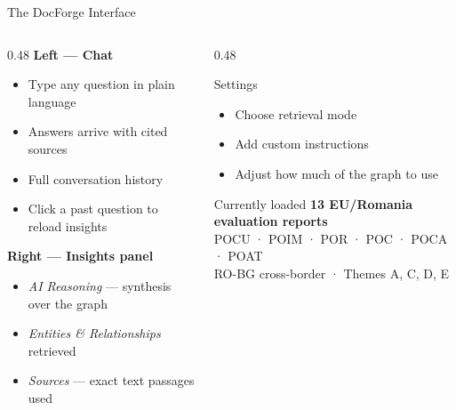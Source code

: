 \documentclass[aspectratio=169,11pt]{beamer}
\begin{document}
\begin{frame}{The DocForge Interface}
  \vspace{0.1cm}
  \begin{columns}[t]
    \begin{column}{0.48\textwidth}
      \textbf{Left — Chat}
      \begin{itemize}\setlength\itemsep{7pt}
        \item Type any question in plain language
        \item Answers arrive with cited sources
        \item Full conversation history
        \item Click a past question to reload insights
      \end{itemize}
      \vspace{0.5em}
      \textbf{Right — Insights panel}
      \begin{itemize}\setlength\itemsep{7pt}
        \item \textit{AI Reasoning} — synthesis over the graph
        \item \textit{Entities \& Relationships} retrieved
        \item \textit{Sources} — exact text passages used
      \end{itemize}
    \end{column}
    \begin{column}{0.48\textwidth}
      \begin{block}{Settings}
        \begin{itemize}\setlength\itemsep{6pt}
          \item Choose retrieval mode
          \item Add custom instructions
          \item Adjust how much of the graph to use
        \end{itemize}
      \end{block}
      \vspace{0.5em}
      \begin{alertblock}{Currently loaded}
        \textbf{13 EU/Romania evaluation reports}\\[4pt]
        POCU · POIM · POR · POC · POCA · POAT\\
        RO-BG cross-border · Themes A, C, D, E
      \end{alertblock}
    \end{column}
  \end{columns}
\end{frame}
\end{document}
